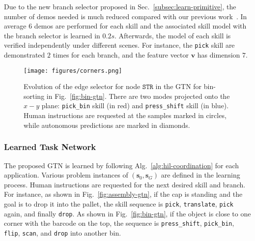 Due to the new branch selector proposed in Sec.~\ref{subsec:learn-primitive}, 
the number of demos needed is much reduced compared with our previous work~\cite{Schwenkel2019Optimizing, rozo2020learning}.
In average $6$ demos are performed for each skill and the associated skill model with the branch selector is learned in $0.2s$.
Afterwards, the model of each skill is verified independently under different scenes.
For instance, the \texttt{pick} skill are demonstrated $2$ times for each branch,
and the feature vector $\mathbf{v}$ has dimension $7$.

\begin{figure}[t!]
    \centering
    \texttt{[image: figures/corners.png]}
    \caption{Evolution of the edge selector for node $\texttt{STR}$ in the GTN for bin-sorting in Fig.~\ref{fig:bin-gtn}.
    There are two modes projected onto the $x-y$ plane: 
    \texttt{pick\_bin} skill (in red) and \texttt{press\_shift} skill (in blue). 
    Human instructions are requested at the samples marked in circles, 
    while autonomous predictions are marked in diamonds.}
    \label{fig:change-edge-selector}
    \vspace{-0.15cm}
\end{figure}

\subsubsection{Learned Task Network}\label{subsubsec:task-network-results}
The proposed GTN is learned by following Alg.~\ref{alg:hil-coordination} for each application.
Various problem instances of $(\boldsymbol{s}_0, \boldsymbol{s}_G)$ are defined in the learning process.
Human instructions are requested for the next desired  skill and branch.
For instance, as shown in Fig.~\ref{fig:assembly-gtn},
if the cap is standing and the goal is to drop it into the pallet, 
the skill sequence is \texttt{pick}, \texttt{translate}, \texttt{pick} again, and finally \texttt{drop}.
As shown in Fig.~\ref{fig:bin-gtn}, 
if the object is close to one corner with the barcode on the top, 
the sequence is \texttt{press\_shift},  \texttt{pick\_bin}, \texttt{flip}, \texttt{scan}, and  \texttt{drop} into another bin.

